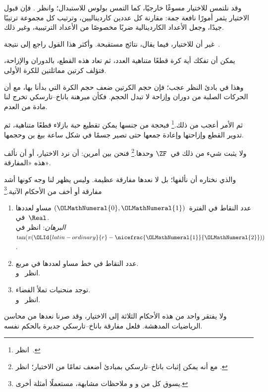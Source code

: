 \documentclass[../../../include/open-logic-section]{subfiles}
\begin{document}

وقد نلتمس للاختيار مسوغًا خارجيًا، كما التمس بولوس للاستبدال؛ وانظر
. فإن قبول الاختيار يثمر أمورًا
نافعة جمة: مقارنة كل عددين كارديناليين، وترتيب كل مجموعة ترتيبًا جيدًا،
وجعل الأعداد الكاردينالية ضربًا مخصوصًا من الأعداد الترتيبية، وغير ذلك.

غير أن للاختيار، فيما يقال، نتائج مستقبحة. وأكثر هذا القول راجع إلى
نتيجة~\cite{BanachTarski1924}.

\begin{thm}
يمكن أن تفكك أية كرة قطعًا متناهية العدد، ثم تعاد هذه القطع، بالدوران
والإزاحة، فتؤلف كرتين مماثلتين للكرة الأولى.
\end{thm}
\noindent
وهذا في بادئ النظر عجب؛ فإن حجم الكرتين ضعف حجم الكرة التي بدأنا بها،
مع أن الحركات الصلبة من دوران وإزاحة لا تبدل الحجم. فكأن مبرهنة
باناخ--تارسكي تخرج لنا مادة من العدم.

ثم الأمر أعجب من ذلك.\footnote{انظر~\citet[Theorem 3.12]{Wagon2016}.}
فبحجة من جنسها يمكن تقطيع حبة بازلاء قطعًا متناهية، ثم تدوير القطع
وإزاحتها وإعادة جمعها حتى تصير جسمًا في شكل ساعة بيغ بن وحجمها.

ولا يثبت شيء من ذلك في~$\ZF$ وحدها.\footnote{مع أنه يمكن إثبات
باناخ--تارسكي بمبادئ أضعف تمامًا من الاختيار؛ انظر
\citet[303]{Wagon2016}.} فنحن بين أمرين: أن نرد الاختيار، أو أن نألف
هذه «المفارقة».

والذي نختاره أن نألفها؛ بل لا نعدها مفارقة عظيمة. وليس يظهر لنا وجه
كونها أشد مفارقة أو أخف من الأحكام الآتية.\footnote{يسوق كل من
\citet[276--7]{Potter2004} و\citet[16]{Weston2003} و
\citet[31, 308--9]{Wagon2016} ملاحظات مشابهة، مستعملًا أمثلة أخرى.}
\begin{enumerate}
	\item عدد النقاط في الفترة~$({\OLMathNumeral{0}},{\OLMathNumeral{1}})$ مساو لعددها في~$\Real$.
	\\\emph{البرهان}: انظر في~$\tan(\pi({\OLId{latin-ordinary}{r}}-\nicefrac{{\OLMathNumeral{1}}}{{\OLMathNumeral{2}}}))$.
	\item عدد النقاط في خط مساو لعددها في مربع.
	\\انظر~ و.
	\item توجد منحنيات تملأ الفضاء.
	\\انظر~ و.
\end{enumerate}
ولا يفتقر واحد من هذه الأحكام الثلاثة إلى الاختيار، وقد صرنا نعدها من
محاسن الرياضيات المدهشة. فلعل مفارقة باناخ--تارسكي جديرة بالحكم نفسه.
\end{document}
